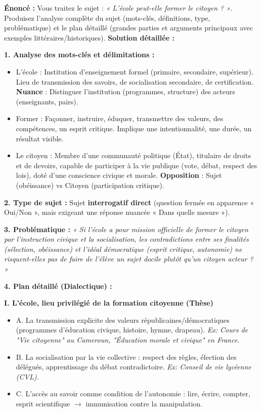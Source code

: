 \documentclass[11pt]{article}
\newcommand{\cle}[1]{{\popxbold\color{popdark}#1}}
\begin{document}
\begin{exoresolu}
    \textbf{Énoncé :} Vous traitez le sujet : \emph{« L'école peut-elle former le citoyen ? »}. Produisez l'analyse complète du sujet (mots-clés, définitions, type, problématique) et le plan détaillé (grandes parties et arguments principaux avec exemples littéraires/historiques).
    \tcblower
    \textbf{Solution détaillée :}
    
    \textbf{1. Analyse des mots-clés et délimitations :}
    \begin{itemize}
        \item \cle{L'école} : Institution d'enseignement formel (primaire, secondaire, supérieur). Lieu de transmission des savoirs, de socialisation secondaire, de certification. \textbf{Nuance} : Distinguer l'institution (programmes, structure) des acteurs (enseignants, pairs).
        \item \cle{Former} : Façonner, instruire, éduquer, transmettre des valeurs, des compétences, un esprit critique. Implique une intentionnalité, une durée, un résultat visible.
        \item \cle{Le citoyen} : Membre d'une communauté politique (État), titulaire de droits et de devoirs, capable de participer à la vie publique (vote, débat, respect des lois), doté d'une conscience civique et morale. \textbf{Opposition} : Sujet (obéissance) vs Citoyen (participation critique).
    \end{itemize}
    
    \textbf{2. Type de sujet :} Sujet \textbf{interrogatif direct} (question fermée en apparence « Oui/Non », mais exigeant une réponse nuancée « Dans quelle mesure »).
    
    \textbf{3. Problématique :}
    \emph{« Si l'école a pour mission officielle de former le citoyen par l'instruction civique et la socialisation, les contradictions entre ses finalités (sélection, obéissance) et l'idéal démocratique (esprit critique, autonomie) ne risquent-elles pas de faire de l'élève un sujet docile plutôt qu'un citoyen acteur ? »}
    
    \textbf{4. Plan détaillé (Dialectique) :}
    
    \textbf{I. L'école, lieu privilégié de la formation citoyenne (Thèse)}
    \begin{itemize}
        \item A. La transmission explicite des valeurs républicaines/démocratiques (programmes d'éducation civique, histoire, hymne, drapeau). \textit{Ex: Cours de "Vie citoyenne" au Cameroun, "Éducation morale et civique" en France.}
        \item B. La socialisation par la vie collective : respect des règles, élection des délégués, apprentissage du débat contradictoire. \textit{Ex: Conseil de vie lycéenne (CVL).}
        \item C. L'accès au savoir comme condition de l'autonomie : lire, écrire, compter, esprit scientifique $\rightarrow$ immunisation contre la manipulation.
    \end{itemize}
    

\end{exoresolu}
\end{document}
